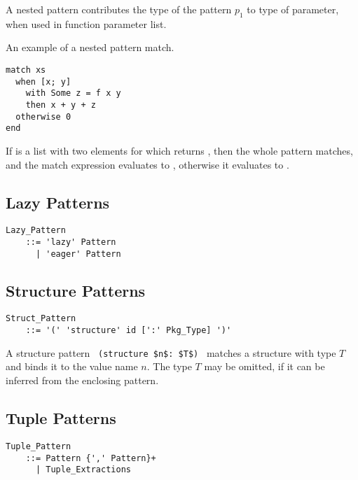 A nested pattern contributes the type of the pattern $p_1$ to type of parameter, when used in function parameter list. 

\example An example of a nested pattern match.
\begin{lstlisting}
match xs
  when [x; y] 
    with Some z = f x y 
    then x + y + z
  otherwise 0
end
\end{lstlisting}
If  is a list with two elements for which  returns , then the whole pattern matches, and the match expression evaluates to , otherwise it evaluates to . 




\subsection{Lazy Patterns}
\label{sec:lazy-patterns}

\grammar\begin{lstlisting}
Lazy_Pattern 
    ::= 'lazy' Pattern
      | 'eager' Pattern
\end{lstlisting}





\subsection{Structure Patterns}
\label{sec:structure-patterns}

\grammar\begin{lstlisting}
Struct_Pattern 
    ::= '(' 'structure' id [':' Pkg_Type] ')'
\end{lstlisting}

A structure pattern ~\lstinline!(structure $n$: $T$)!~ matches a structure with type $T$ and binds it to the value name $n$. The type $T$ may be omitted, if it can be inferred from the enclosing pattern. 










\subsection{Tuple Patterns}
\label{sec:tuple-patterns}

\grammar\begin{lstlisting}
Tuple_Pattern 
    ::= Pattern {',' Pattern}+
      | Tuple_Extractions
\end{lstlisting}

